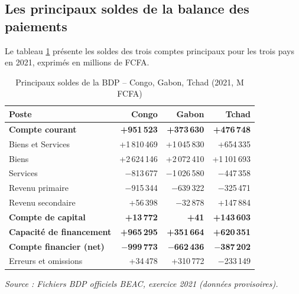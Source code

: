 \documentclass[12pt,a4paper]{article}
\begin{document}
\subsection{Les principaux soldes de la balance des paiements}

Le tableau \ref{tab:soldes_principaux} présente les soldes des trois comptes principaux
pour les trois pays en 2021, exprimés en millions de FCFA.

\begin{table}[h!]
  \centering
  \caption{Principaux soldes de la BDP -- Congo, Gabon, Tchad (2021, M FCFA)}
  \label{tab:soldes_principaux}
  \small
  \begin{tabular}{lrrr}
    \toprule
    \textbf{Poste} & \textbf{Congo} & \textbf{Gabon} & \textbf{Tchad} \\
    \midrule
    \rowcolor{lightgray}
    \textbf{Compte courant} & \textbf{+951\,523} & \textbf{+373\,630} & \textbf{+476\,748} \\
    \quad Biens et Services & +1\,810\,469 & +1\,045\,830 & +654\,335 \\
    \quad\quad Biens        & +2\,624\,146 & +2\,072\,410 & +1\,101\,693 \\
    \quad\quad Services     &   $-$813\,677 & $-$1\,026\,580 & $-$447\,358 \\
    \quad Revenu primaire   &   $-$915\,344 &   $-$639\,322 & $-$325\,471 \\
    \quad Revenu secondaire &    +56\,398 &    $-$32\,878 & +147\,884 \\
    \midrule
    \rowcolor{lightgray}
    \textbf{Compte de capital} & \textbf{+13\,772} & \textbf{+41} & \textbf{+143\,603} \\
    \midrule
    \rowcolor{lightgray}
    \textbf{Capacité de financement} & \textbf{+965\,295} & \textbf{+351\,664} & \textbf{+620\,351} \\
    \midrule
    \rowcolor{lightgray}
    \textbf{Compte financier (net)} & \textbf{$-$999\,773} & \textbf{$-$662\,436} & \textbf{$-$387\,202} \\
    \midrule
    Erreurs et omissions & +34\,478 & +310\,772 & $-$233\,149 \\
    \bottomrule
  \end{tabular}

  \smallskip
  \footnotesize\textit{Source : Fichiers BDP officiels BEAC, exercice 2021 (données provisoires).}
\end{table}
\end{document}
